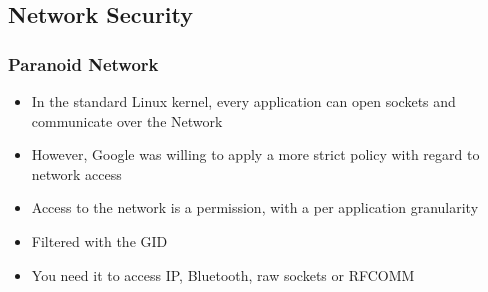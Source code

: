 \subsection{Network Security}
\begin{frame}
  \frametitle{Paranoid Network}
  \begin{itemize}
  \item In the standard Linux kernel, every application can open
    sockets and communicate over the Network
  \item However, Google was willing to apply a more strict policy with
    regard to network access
  \item Access to the network is a permission, with a per application
    granularity
  \item Filtered with the GID
  \item You need it to access IP, Bluetooth, raw sockets or RFCOMM
  \end{itemize}
\end{frame}
